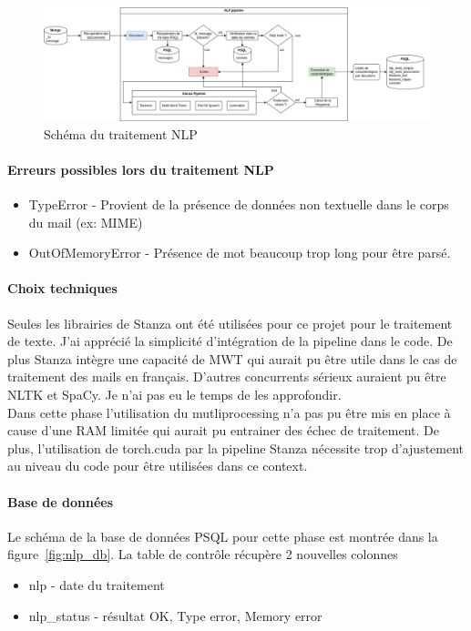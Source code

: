     \begin{figure}[H]
        \includegraphics[width=\linewidth]{img/nlp}
        \caption{Schéma du traitement NLP}
        \label{fig:nlp}
    \end{figure}

    \paragraph{Erreurs possibles lors du traitement NLP}
    \begin{itemize}
        \item TypeError - Provient de la présence de données non textuelle dans le corps du mail (ex: MIME)
		\item OutOfMemoryError - Présence de mot beaucoup trop long pour être parsé.
	\end{itemize}

    \paragraph{Choix techniques}
        Seules les librairies de Stanza ont été utilisées pour ce projet pour le traitement de texte.
        J'ai apprécié la simplicité d'intégration de la pipeline dans le code.
        De plus Stanza intègre une capacité de MWT qui aurait pu être utile dans le cas de traitement des mails en français.
        D'autres concurrents sérieux auraient pu être NLTK et SpaCy. Je n'ai pas eu le temps de les approfondir.\\

        Dans cette phase l'utilisation du mutliprocessing n'a pas pu être mis en place à cause d'une RAM limitée qui aurait pu entrainer des échec de traitement.
        De plus, l'utilisation de torch.cuda par la pipeline Stanza nécessite trop d'ajustement au niveau du code pour être utilisées dans ce context.

    \paragraph{Base de données}
        Le schéma de la base de données PSQL pour cette phase est montrée dans la figure~\ref{fig:nlp_db}.
        La table de contrôle récupère 2 nouvelles colonnes
        \begin{itemize}
            \item nlp - date du traitement
            \item nlp\_status - résultat OK, Type error, Memory error
        \end{itemize}

